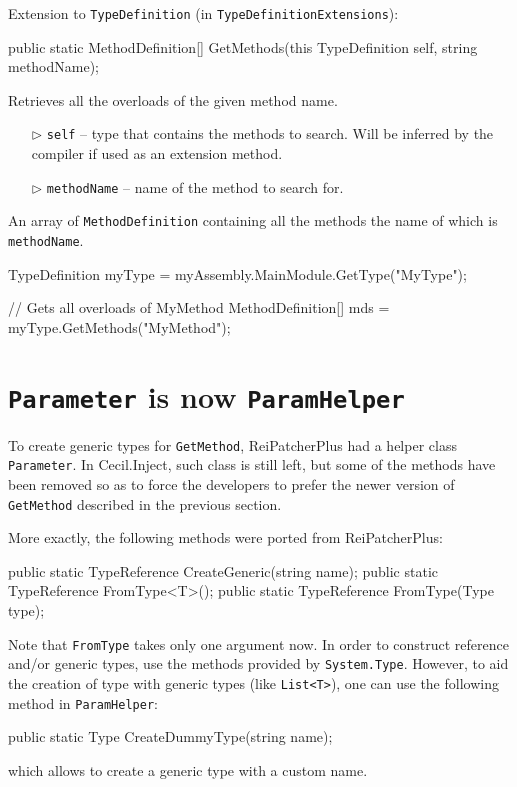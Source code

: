 \documentclass[a4paper,11pt]{article}
\newcommand{\CecilInject}{\textsc{C}{\scriptsize \sc ecil}.\textsc{I}{\scriptsize \sc nject}}
\begin{document}
\begin{mdef}
Extension to \texttt{TypeDefinition} (in \texttt{TypeDefinitionExtensions}):
\begin{cs}
public static MethodDefinition[] GetMethods(this TypeDefinition self, 
                                            string methodName);
\end{cs}

Retrieves all the overloads of the given method name.

\begin{itemize}
\item[$\triangleright$] \texttt{self} -- type that contains the methods to search. Will be inferred by the compiler if used as an extension method.
\item[$\triangleright$] \texttt{methodName} -- name of the method to search for.
\end{itemize}

An array of \texttt{MethodDefinition} containing all the methods the name of which is \texttt{methodName}.

\begin{cs}
TypeDefinition myType = myAssembly.MainModule.GetType("MyType");

// Gets all overloads of MyMethod
MethodDefinition[] mds = myType.GetMethods("MyMethod");
\end{cs}
\end{mdef}

\section{\texttt{Parameter} is now \texttt{ParamHelper}}
To create generic types for \texttt{GetMethod}, ReiPatcherPlus had a helper class \texttt{Parameter}. In \CecilInject{}, such class is still left, but some of the methods have been removed so as to force the developers to prefer the newer version of \texttt{GetMethod} described in the previous section.

More exactly, the following methods were ported from ReiPatcherPlus:
\begin{cs}
public static TypeReference CreateGeneric(string name);
public static TypeReference FromType<T>();
public static TypeReference FromType(Type type);
\end{cs}

Note that \texttt{FromType} takes only one argument now. In order to construct reference and/or generic types, use the methods provided by \texttt{System.Type}. However, to aid the creation of type with generic types (like \texttt{List<T>}), one can use the following method in \texttt{ParamHelper}:
\begin{cs}
public static Type CreateDummyType(string name);
\end{cs}
which allows to create a generic type with a custom name.
\end{document}
